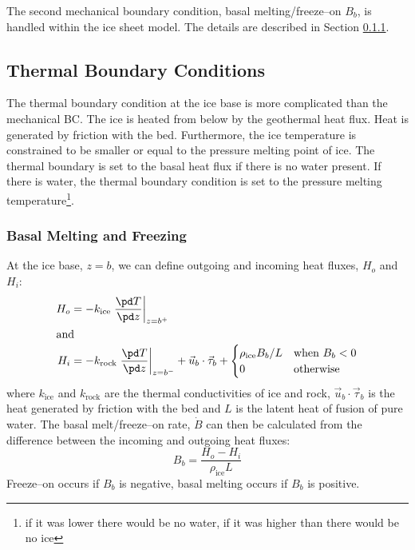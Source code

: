 The second mechanical boundary condition, basal melting/freeze--on $B_b$, is handled within the ice sheet model. The details are described in Section \ref{num.sec.bc_melt}.

\subsection{Thermal Boundary Conditions}
The thermal boundary condition at the ice base is more complicated than the mechanical BC. The ice is heated from below by the geothermal heat flux. Heat is generated by friction with the bed. Furthermore, the ice temperature is constrained to be smaller or equal to the pressure melting point of ice. The thermal boundary is set to the basal heat flux if there is no water present. If there is water, the thermal boundary condition is set to the pressure melting temperature\footnote{if it was lower there would be no water, if it was higher than there would be no ice}.

\subsubsection{Basal Melting and Freezing}\label{num.sec.bc_melt}
At the ice base, $z=b$, we can define outgoing and incoming heat fluxes, $H_o$ and $H_i$:
\begin{subequations}
  \begin{align}
    H_o&=-k_{\text{ice}}\left.\frac{\pd T}{\pd z}\right|_{z=b^+}\\
    \intertext{and}
    H_i&=-k_{\text{rock}}\left.\frac{\pd T}{\pd z}\right|_{z=b^-}+\vec{u}_b\cdot\vec{\tau}_b+
    \begin{cases}
      {\rho_{\text{ice}}B_b}/{L} & \text{when $B_b<0$} \\
      0 & \text{otherwise}
    \end{cases}
  \end{align}
\end{subequations}
where $k_{\text{ice}}$ and $k_{\text{rock}}$ are the thermal conductivities of ice and rock, $\vec{u}_b\cdot\vec{\tau}_b$ is the heat generated by friction with the bed and $L$ is the latent heat of fusion of pure water. The basal melt/freeze--on rate, $\dot{B}$ can then be calculated from the difference between the incoming and outgoing heat fluxes:
\begin{equation}
  \label{bc.eq.meltrate}
  B_b=\frac{H_o-H_i}{\rho_{\text{ice}}L}
\end{equation}
Freeze--on occurs if $B_b$ is negative, basal melting occurs if $B_b$ is positive.

